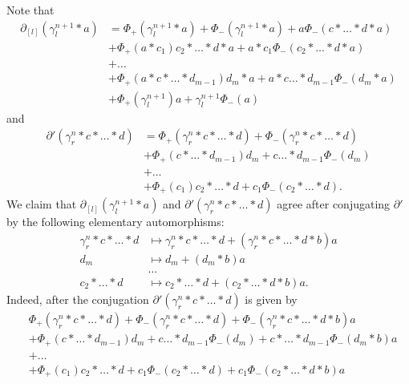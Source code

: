 \documentclass[11pt]{amsart}
\makeatletter
\renewenvironment{proof}[1][\proofname] {\par\pushQED{\qed}{\normalfont\bfseries\topsep6\p@\@plus6\p@\relax #1\@addpunct{.} }}{\popQED\endtrivlist\@endpefalse}
\theoremstyle{mystyle}
\newcommand{\<}{\langle}
\renewcommand{\>}{\rangle}
\makeatother
\begin{document}
\begin{proof}
     Note that \begin{align*}
        \partial_{[l]}(\gamma_l^{n+1} * a) &= \Phi_+(\gamma_l^{n+1} * a) + \Phi_-(\gamma_l^{n+1} * a) + a \Phi_-(c * \dots * d * a) \\
        &+ \Phi_+(a * c_1) c_2 * \dots * d * a + a * c_1 \Phi_-(c_2 * \dots * d * a) \\
        &+ \ldots \\
        &+ \Phi_+(a * c * \dots * d_{m-1}) d_m * a + a * c \dots * d_{m-1} \Phi_-(d_m * a) \\
        &+ \Phi_+(\gamma_l^{n+1}) a + \gamma_l^{n+1} \Phi_-(a)
    \end{align*} and \begin{align*}
        \partial'(\gamma_r^n * c * \dots * d) &= \Phi_+(\gamma_r^n * c * \dots * d) + \Phi_-(\gamma_r^n * c * \dots * d) \\
        &+ \Phi_+(c * \dots * d_{m-1}) d_m + c  \dots * d_{m-1} \Phi_-(d_m) \\
        &+ \ldots \\
        &+ \Phi_+(c_1)c_2 * \dots * d + c_1 \Phi_-(c_2 * \dots * d).
    \end{align*}
    We claim that $\partial_{[l]}(\gamma_l^{n+1} * a)$ and $\partial'(\gamma_r^n * c * \dots * d)$ agree after conjugating $\partial'$ by the following elementary automorphisms: \begin{align*}
        \gamma_r^n * c * \dots * d &\mapsto \gamma_r^n * c * \dots * d + (\gamma_r^n * c * \dots * d * b)a \\
        d_m &\mapsto d_m + (d_m * b) a \\
        &\ldots \\
        c_2 * \dots * d &\mapsto c_2 * \dots * d + (c_2 * \dots * d * b)a.
    \end{align*} Indeed, after the conjugation $\partial'(\gamma_r^n * c * \dots * d)$ is given by \begin{align*}
        &\Phi_+(\gamma_r^n * c * \dots * d) + \Phi_-(\gamma_r^n * c * \dots * d) + \Phi_-(\gamma_r^n * c * \dots * d * b) a \\
        &+ \Phi_+(c * \dots * d_{m-1}) d_m + c  \dots * d_{m-1} \Phi_-(d_m) + c * \dots * d_{m-1} \Phi_-(d_m * b) a \\
        &+ \ldots \\
        &+ \Phi_+(c_1)c_2 * \dots * d + c_1 \Phi_-(c_2 * \dots * d) + c_1 \Phi_-(c_2 * \dots * d * b)a \\

\end{align*}
\end{proof}
\end{document}
